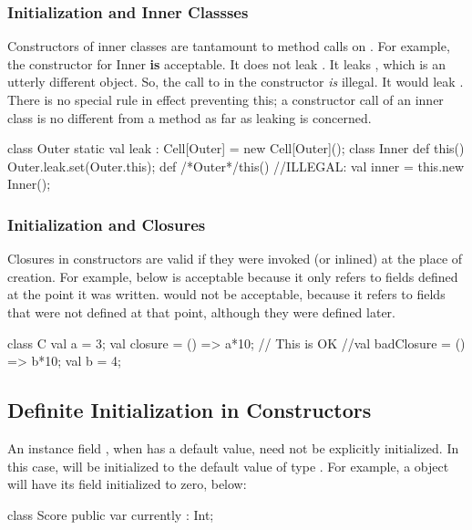 \subsubsection{Initialization and Inner Classses}

Constructors of inner classes are tantamount to method calls on .  
For example, the constructor for Inner {\bf is} acceptable.  It does not leak
.  It leaks , which is an utterly different object.  
So, the call to  in the  constructor {\em
is} illegal.  It would leak .  There is no special rule in effect
preventing this; a constructor call of an inner class is no 
different from a method as far as leaking is concerned.
\begin{xten}
class Outer {
  static val leak : Cell[Outer] = new Cell[Outer]();
  class Inner {
     def this() {Outer.leak.set(Outer.this);}
  }
  def /*Outer*/this() {
     //ILLEGAL: val inner = this.new Inner(); 
  }
}
\end{xten}
%



\subsubsection{Initialization and Closures}

Closures in constructors are valid if they were invoked (or inlined) at the
place of creation. For example,  below is acceptable because it
only refers to fields defined at the point it was written.  
would not be acceptable, because it refers to fields that were not defined at
that point, although they were defined later.
\begin{xten}
class C {
  val a = 3;
  val closure = () => a*10; // This is OK
  //val badClosure = () => b*10; 
  val b = 4;
}
\end{xten}
%


\subsection{Definite Initialization in Constructors}


An instance field , when  has a default value, need not be
explicitly initialized.  In this case,  will be initialized to the
default value of type .  For example, a  object will have
its  field initialized to zero, below:
\begin{xten}
class Score {
  public var currently : Int;
}
\end{xten}
%


